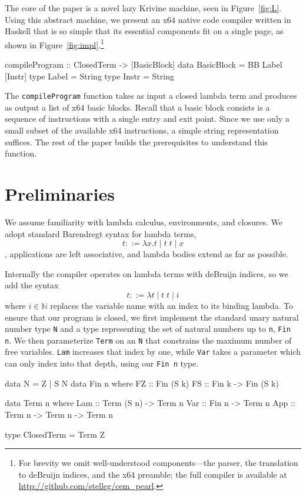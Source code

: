 \documentclass[preprint]{sigplanconf}
\begin{document}
The core of the paper is a novel lazy Krivine machine, seen in
Figure~\ref{fig:L}. Using this abstract machine, we present an x64 native code
compiler written in Haskell that is so simple that its essential components fit
on a single page, as shown in Figure~\ref{fig:impl}.\footnote{For brevity we
omit well-understood components---the parser, the translation to deBruijn
indices, and the x64 preamble; the full compiler is available at
\url{http://github.com/stelleg/cem_pearl}.} 

\begin{code}
compileProgram :: ClosedTerm -> [BasicBlock]
data BasicBlock = BB Label [Instr]
type Label = String
type Instr = String
\end{code}

The \texttt{compileProgram} function takes as input a closed lambda term and
produces as output a list of x64 basic blocks. Recall that a basic block
consists is a sequence of instructions with a single entry and exit point.
Since we use only a small subset of the available x64 instructions, a simple
string representation suffices. The rest of the paper builds the prerequisites
to understand this function.

\section{Preliminaries}
We assume familiarity with lambda calculus, environments, and closures.
We adopt standard Barendregt syntax \cite{barendregt1984lambda} for lambda
terms, $$ t ::=  \lambda x.t \; | \; t \;  t \; | \; x $$, applications are
left associative, and lambda bodies extend as far as possible. 

Internally the compiler operates on lambda terms with deBruijn indices, so we
add the syntax $$ t ::= \lambda t \; | \; t \; t \; | \; i $$ where $i \in
\mathbb{N}$ replaces the variable name with an index to its binding lambda. To
ensure that our program is closed, we first implement the standard unary natural
number type \texttt{N} and a type representing the set of natural numbers up to
\texttt{n}, \texttt{Fin n}. We then parameterize \texttt{Term} on an \texttt{N}
that constrains the maximum number of free variables. \texttt{Lam} increases
that index by one, while \texttt{Var} takes a parameter which can only index
into that depth, using our \texttt{Fin n} type.

\begin{code}
data N = Z | S N
data Fin n where
  FZ :: Fin (S k)
  FS :: Fin k -> Fin (S k)

data Term n where
  Lam :: Term (S n) -> Term n
  Var :: Fin n -> Term n 
  App :: Term n -> Term n -> Term n

type ClosedTerm = Term Z
\end{code}
\end{document}
